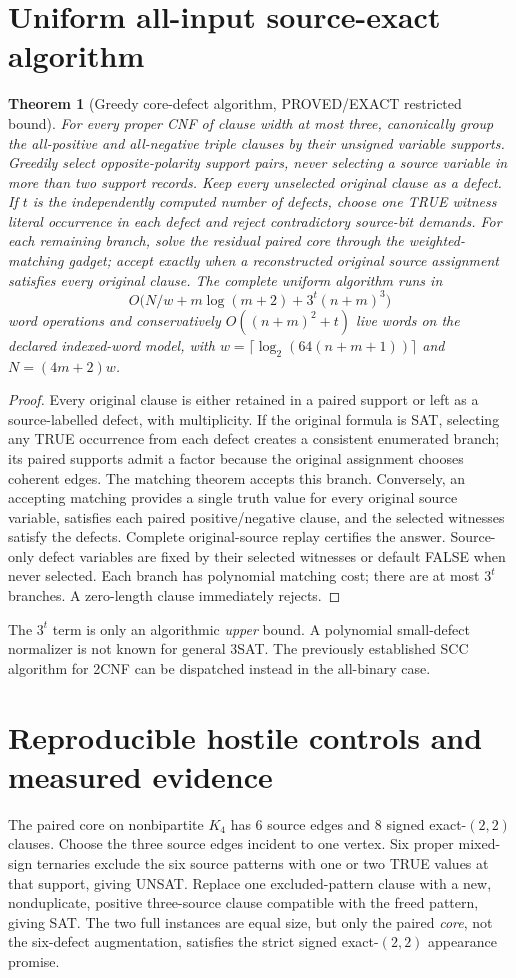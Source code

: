 \documentclass[11pt]{article}
\newtheorem{theorem}{Theorem}
\begin{document}
\section{Uniform all-input source-exact algorithm}
\begin{theorem}[Greedy core-defect algorithm, PROVED/EXACT restricted bound]
For every proper CNF of clause width at most three, canonically group the all-positive and all-negative triple clauses by their unsigned variable supports. Greedily select opposite-polarity support pairs, never selecting a source variable in more than two support records. Keep every unselected original clause as a defect. If $t$ is the \emph{independently computed} number of defects, choose one TRUE witness literal occurrence in each defect and reject contradictory source-bit demands. For each remaining branch, solve the residual paired core through the weighted-matching gadget; accept exactly when a reconstructed original source assignment satisfies every original clause. The complete uniform algorithm runs in
\[
O\bigl(N/w+m\log(m+2)+3^t(n+m)^3\bigr)
\]
word operations and conservatively $O((n+m)^2+t)$ live words on the declared indexed-word model, with $w=\lceil\log_2(64(n+m+1))\rceil$ and $N=(4m+2)w$.
\end{theorem}
\begin{proof}
Every original clause is either retained in a paired support or left as a source-labelled defect, with multiplicity. If the original formula is SAT, selecting any TRUE occurrence from each defect creates a consistent enumerated branch; its paired supports admit a factor because the original assignment chooses coherent edges. The matching theorem accepts this branch. Conversely, an accepting matching provides a single truth value for every original source variable, satisfies each paired positive/negative clause, and the selected witnesses satisfy the defects. Complete original-source replay certifies the answer. Source-only defect variables are fixed by their selected witnesses or default FALSE when never selected. Each branch has polynomial matching cost; there are at most $3^t$ branches. A zero-length clause immediately rejects.
\end{proof}
The $3^t$ term is only an algorithmic \emph{upper} bound. A polynomial small-defect normalizer is not known for general 3SAT. The previously established SCC algorithm for 2CNF can be dispatched instead in the all-binary case.

\section{Reproducible hostile controls and measured evidence}
The paired core on nonbipartite $K_4$ has 6 source edges and 8 signed exact-$(2,2)$ clauses. Choose the three source edges incident to one vertex. Six proper mixed-sign ternaries exclude the six source patterns with one or two TRUE values at that support, giving UNSAT. Replace one excluded-pattern clause with a new, nonduplicate, positive three-source clause compatible with the freed pattern, giving SAT. The two full instances are equal size, but only the paired \emph{core}, not the six-defect augmentation, satisfies the strict signed exact-$(2,2)$ appearance promise.
\end{document}
